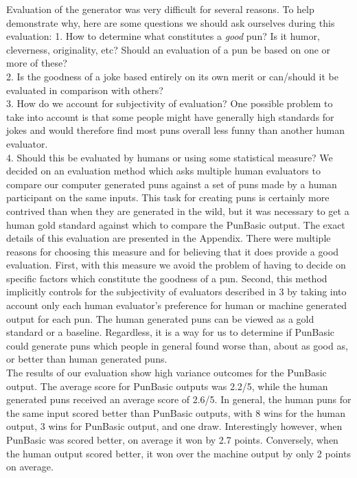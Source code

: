 \documentclass[11pt,letterpaper]{article}
\begin{document}
Evaluation of the generator was very difficult for several reasons. To help demonstrate why, here are some questions we should ask ourselves during this evaluation: 
1. How to determine what constitutes a \textit{good} pun? Is it humor, cleverness, originality, etc? Should an evaluation of a pun be based on one or more of these?\\
2. Is the goodness of a joke based entirely on its own merit or can/should it be evaluated in comparison with others?\\
3. How do we account for subjectivity of evaluation? One possible problem to take into account is that some people might have generally high standards for jokes and would therefore find most puns overall less funny than another human evaluator.\\
4. Should this be evaluated by humans or using some statistical measure?
We decided on an evaluation method which asks multiple human evaluators to compare our computer generated puns against a set of puns made by a human participant on the same inputs. This task for creating puns is certainly more contrived than when they are generated in the wild, but it was necessary to get a human gold standard against which to compare the PunBasic output. The exact details of this evaluation are presented in the Appendix.
There were multiple reasons for choosing this measure and for believing that it does provide a good evaluation. First, with this measure we avoid the problem of having to decide on specific factors which constitute the goodness of a pun. Second, this method implicitly controls for the subjectivity of evaluators described in 3 by taking into account only each human evaluator's preference for human or machine generated output for each pun. The human generated puns can be viewed as a gold standard or a baseline. Regardless, it is a way for us to determine if PunBasic could generate puns which people in general found worse than, about as good as, or better than human generated puns.\\
The results of our evaluation show high variance outcomes for the PunBasic output. The average score for PunBasic outputs was 2.2/5, while the human generated puns received an average score of 2.6/5. In general, the human puns for the same input scored better than PunBasic outputs, with 8 wins for the human output, 3 wins for PunBasic output, and one draw. Interestingly however, when PunBasic was scored better, on average it won by 2.7 points. Conversely, when the human output scored better, it won over the machine output by only 2 points on average.
\end{document}
